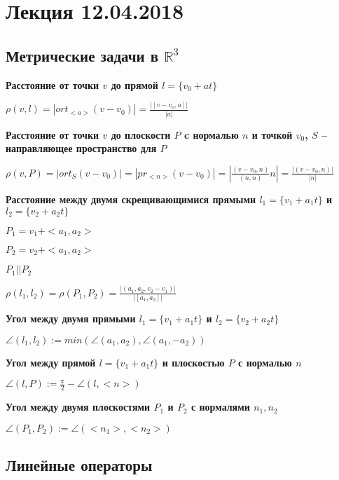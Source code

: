 \section{Лекция 12.04.2018}

\subsection{Метрические задачи в $\mathbb{R}^3$}

\textbf{Расстояние от точки $v$ до прямой $l = \{v_0 + at\}$} 

$\rho(v, l) = |ort_{<a>} (v - v_0)| = \frac{|[v-v_0, a]|}{|a|}$

\vspace{\baselineskip}
\textbf{Расстояние от точки $v$ до плоскости $P$ c нормалью $n$ и точкой $v_0$, $S$ -- направляющее пространство для $P$}

$\rho(v, P) = |ort_S (v-v_0)| = |pr_{<n>} (v-v_0)| = |\frac{(v - v_0, n)}{(n, n)} n| = \frac{|(v - v_0, n)|}{|n|}$

\vspace{\baselineskip}
\textbf{Расстояние между двумя скрещивающимися прямыми $l_1 = \{v_1 + a_1 t\}$ и $l_2 = \{v_2 + a_2 t\}$}

$P_1 = v_1 + <a_1, a_2>$

$P_2 = v_2 + <a_1, a_2>$

$P_1 || P_2$

$\rho (l_1, l_2) = \rho (P_1, P_2) = \frac{|(a_1, a_2, v_2 - v_1)|}{|[a_1, a_2]|}$

\vspace{\baselineskip}
\textbf{Угол между двумя прямыми $l_1 = \{v_1 + a_1 t\}$ и $l_2 = \{v_2 + a_2 t\}$}

$\angle (l_1, l_2):= min( \angle (a_1, a_2), \angle (a_1, -a_2))$

\vspace{\baselineskip}
\textbf{Угол между прямой $l = \{v_1 + a_1 t\}$ и плоскостью  $P$ с нормалью $n$}

$\angle (l, P) := \frac{\pi}{2} - \angle (l, <n>)$

\vspace{\baselineskip}
\textbf{Угол между двумя плоскостями $P_1$ и $P_2$ с нормалями $n_1, n_2$}

$\angle (P_1, P_2) := \angle (<n_1>, <n_2>)$

\subsection{Линейные операторы}


